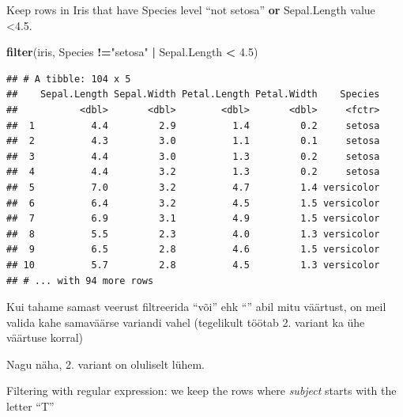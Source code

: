 \documentclass[]{book}
\newenvironment{Shaded}{\begin{snugshade}}{\end{snugshade}}
\newcommand{\KeywordTok}[1]{\textcolor[rgb]{0.13,0.29,0.53}{\textbf{#1}}}
\newcommand{\FloatTok}[1]{\textcolor[rgb]{0.00,0.00,0.81}{#1}}
\newcommand{\StringTok}[1]{\textcolor[rgb]{0.31,0.60,0.02}{#1}}
\newcommand{\OperatorTok}[1]{\textcolor[rgb]{0.81,0.36,0.00}{\textbf{#1}}}
\newcommand{\NormalTok}[1]{#1}
\begin{document}
Keep rows in Iris that have Species level ``not setosa'' \textbf{or}
Sepal.Length value \textless{}4.5.

\begin{Shaded}
\begin{Highlighting}[]
\KeywordTok{filter}\NormalTok{(iris, Species }\OperatorTok{!=}\StringTok{"setosa"} \OperatorTok{|}\StringTok{ }\NormalTok{Sepal.Length }\OperatorTok{<}\StringTok{ }\FloatTok{4.5}\NormalTok{)}
\end{Highlighting}
\end{Shaded}

\begin{verbatim}
## # A tibble: 104 x 5
##    Sepal.Length Sepal.Width Petal.Length Petal.Width    Species
##           <dbl>       <dbl>        <dbl>       <dbl>     <fctr>
##  1          4.4         2.9          1.4         0.2     setosa
##  2          4.3         3.0          1.1         0.1     setosa
##  3          4.4         3.0          1.3         0.2     setosa
##  4          4.4         3.2          1.3         0.2     setosa
##  5          7.0         3.2          4.7         1.4 versicolor
##  6          6.4         3.2          4.5         1.5 versicolor
##  7          6.9         3.1          4.9         1.5 versicolor
##  8          5.5         2.3          4.0         1.3 versicolor
##  9          6.5         2.8          4.6         1.5 versicolor
## 10          5.7         2.8          4.5         1.3 versicolor
## # ... with 94 more rows
\end{verbatim}

Kui tahame samast veerust filtreerida ``või'' ehk ``\textbar{}'' abil
mitu väärtust, on meil valida kahe samaväärse variandi vahel (tegelikult
töötab 2. variant ka ühe väärtuse korral)

\begin{Shaded}
\end{Shaded}

Nagu näha, 2. variant on oluliselt lühem.

Filtering with regular expression: we keep the rows where \emph{subject}
starts with the letter ``T''
\end{document}
